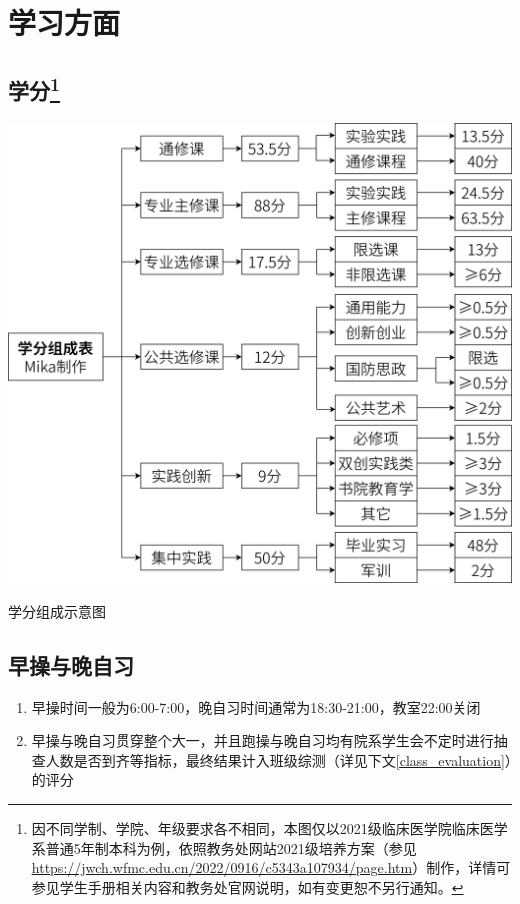 \chapter[学习方面]{学习方面}
\vspace{-1em}
\section[学分]{学分\footnote{因不同学制、学院、年级要求各不相同，本图仅以2021级临床医学院临床医学系普通5年制本科为例，依照教务处网站2021级培养方案（参见\uline{\href{https://jwch.wfmc.edu.cn/2022/0916/c5343a107934/page.htm}{https://jwch.wfmc.edu.cn/2022/0916/c5343a107934/page.htm}}）制作，详情可参见学生手册相关内容和教务处官网说明，如有变更恕不另行通知。}}
\vspace{-1em}
\begin{table}[ht]
    \centering
    \includegraphics[width=\textwidth]{学分.jpg}
    \vspace{-1em}
    \caption[学分组成示意图]{学分组成示意图}
    \label{score}
\end{table}

\newpage

\section[早操与晚自习]{早操与晚自习}
\begin{enumerate}
    \item 早操时间一般为6:00-7:00，晚自习时间通常为18:30-21:00，教室22:00关闭
    \item 早操与晚自习贯穿整个大一\footnotemark，并且跑操与晚自习均有院系学生会不定时进行抽查人数是否到齐等指标，最终结果计入班级综测（详见下文\uline{\ref{class_evaluation}}）的评分
\end{enumerate}

